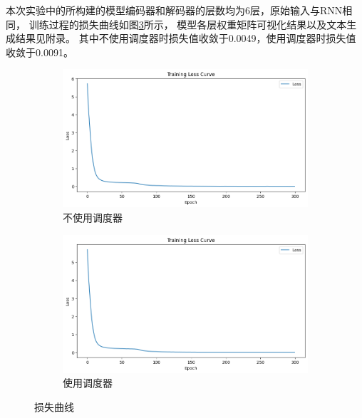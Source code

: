 本次实验中的所构建的模型编码器和解码器的层数均为6层，原始输入与RNN相同，
训练过程的损失曲线如图\ref{fig:TransformerLossHistory}所示，
模型各层权重矩阵可视化结果以及文本生成结果见附录。
其中不使用调度器时损失值收敛于0.0049，使用调度器时损失值收敛于0.0091。
\begin{figure}[H]
    \centering
    \begin{subfigure}[b]{0.45\textwidth}
        \centering
        \includegraphics[width=\linewidth]{../output/transformer/no scheduler/loss history.png}
        \caption{不使用调度器}
        \label{fig:TransformerLossHistorynoscheduler}
    \end{subfigure}
    \hfill
    \begin{subfigure}[b]{0.45\textwidth}
        \centering
        \includegraphics[width=\linewidth]{../output/transformer/with scheduler/loss history.png}
        \caption{使用调度器}
        \label{fig:TransformerLossHistorywithscheduler}
    \end{subfigure}
    \caption{损失曲线}
    \label{fig:TransformerLossHistory}
\end{figure}